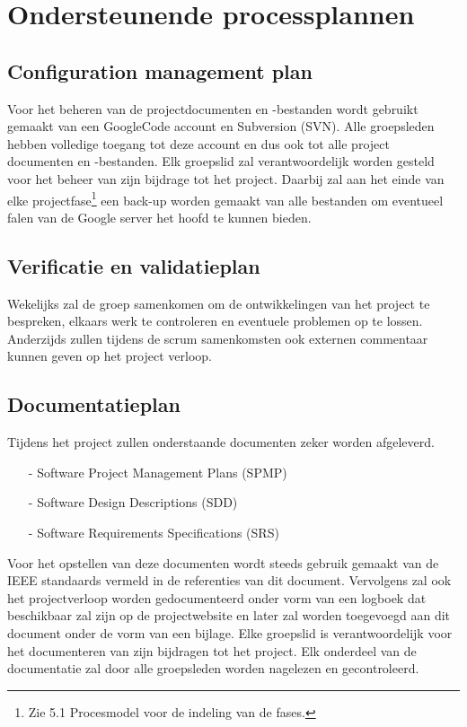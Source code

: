 \documentclass{article}
\begin{document}
\newpage
\section{Ondersteunende processplannen}
\subsection{Configuration management plan}

Voor het beheren van de projectdocumenten en -bestanden wordt gebruikt gemaakt van een GoogleCode account en Subversion (SVN). Alle groepsleden hebben volledige toegang tot deze account en dus ook tot alle project documenten en -bestanden. Elk groepslid zal verantwoordelijk worden gesteld voor het beheer van zijn bijdrage tot het project. Daarbij zal aan het einde van elke projectfase\footnote{Zie 5.1 Procesmodel  voor de indeling van de fases.} een back-up worden gemaakt van alle bestanden om eventueel falen van de Google server het hoofd te kunnen bieden.

\subsection{Verificatie en validatieplan}

Wekelijks zal de groep samenkomen om de ontwikkelingen van het project te bespreken, elkaars werk te controleren en eventuele problemen op te lossen. Anderzijds zullen tijdens de scrum samenkomsten ook externen commentaar kunnen geven op het project verloop.

\subsection{Documentatieplan}

Tijdens het project zullen onderstaande documenten zeker worden afgeleverd.
\begin{itemize}
\item[-] Software Project Management Plans (SPMP)\\[-5mm]
\item[-] Software Design Descriptions (SDD)\\[-5mm]
\item[-] Software Requirements Specifications (SRS)\\[-5mm]
\end{itemize}

Voor het opstellen van deze documenten wordt steeds gebruik gemaakt van de IEEE standaards vermeld in de referenties van dit document.
Vervolgens zal ook het projectverloop worden gedocumenteerd onder vorm van een logboek dat beschikbaar zal zijn op de projectwebsite en later zal worden toegevoegd aan dit document onder de vorm van een bijlage.
Elke groepslid is verantwoordelijk voor het documenteren van zijn bijdragen tot het project. Elk onderdeel van de documentatie zal door alle groepsleden worden nagelezen en gecontroleerd.
\end{document}

